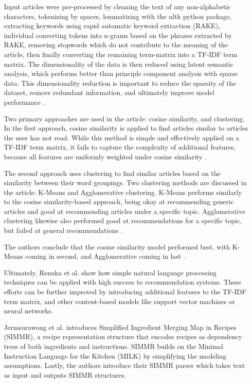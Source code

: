 \documentclass[sigconf]{acmart}
\begin{document}
Input articles were pre-processed by cleaning the text of any non-alphabetic characters, tokenizing by spaces, lemmatizing with the nltk python package, extracting keywords using rapid automatic keyword extraction (RAKE), individual converting tokens into n-grams based on the phrases extracted by RAKE, removing stopwords which do not contribute to the meaning of the article, then finally converting the remaining term-matrix into a TF-IDF term matrix. The dimensionality of the data is then reduced using latent semantic analysis, which performs better than principle component analysis with sparse data. This dimensionality reduction is important to reduce the sparsity of the dataset, remove redundant information, and ultimately improve model performance \cite{RSArticle}.

Two primary approaches are used in the article: cosine similarity, and clustering. In the first approach, cosine similarity is applied to find articles similar to articles the user has not read. While this method is simple and effectively applied on a TF-IDF term matrix, it fails to capture the complexity of additional features, because all features are uniformly weighted under cosine similarity \cite{RSArticle}.

The second approach uses clustering to find similar articles based on the similarity between their word groupings. Two clustering methods are discussed in the article: K-Means and Agglomerative clustering. K-Means performs similarly to the cosine similarity-based approach, being okay at recommending generic articles and good at recommending articles under a specific topic. Agglomerative clustering likewise also performed good at recommendations for a specific topic, but failed at general recommendations \cite{RSArticle}.

The authors conclude that the cosine similarity model performed best, with K-Means coming in second, and Agglomerative coming in last \cite{RSArticle}.

Ultimately, Renuka et al. show how simple natural language processing techniques can be applied with high success to recommendation systems. These efforts can be further improved by introducing additional features to the TF-IDF term matrix, and other content-based models like support vector machines or neural networks.

Jermsurawong et al. \cite{NLPSIMMR} introduces Simplified Ingredient Merging Map in Recipes (SIMMR), a recipe representation structure that encodes recipes as dependency trees of both ingredients and instructions. SIMMR builds on the Minimal Instruction Language for the Kitchen (MILK) by simplifying the modeling assumptions. Lastly, the authors introduce their SIMMR parser which takes text as input and outputs SIMMR structures.
\end{document}
